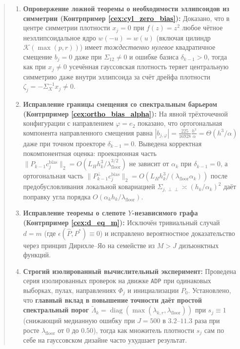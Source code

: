 \documentclass[11pt,a4paper]{article}
\newcommand{\Kern}{\mathcal{K}}
\newcommand{\PEDRs}{P^{*}}
\DeclareMathOperator{\diag}{diag}
\theoremstyle{definition}
\theoremstyle{remark}
\begin{document}
\begin{abstract}
\begin{enumerate}
    \item \textbf{Опровержение ложной теоремы о необходимости эллипсоидов из симметрии (Контрпример \ref{cex:cyl_zero_bias}):} Доказано, что в центре симметрии плотности $x_j = 0$ при $f(z)=z^2$ любое чётное неэллипсоидальное ядро $w(-u)=w(u)$ (включая цилиндр $\Kern(\max(p,r))$) имеет \emph{тождественно нулевое} квадратичное смещение $b_j = 0$ даже при $\Sigma_{12} \neq 0$ и ошибке базиса $\delta_{k-1} > 0$, тогда как при $x_j \neq 0$ усечённая гауссовская плотность теряет центральную симметрию даже внутри эллипсоида за счёт дрейфа плотности $\zeta_j = -\Sigma_X^{-1} x_j \neq 0$.
    \item \textbf{Исправление границы смещения со спектральным барьером (Контрпример \ref{cex:ortho_bias_alpha}):} На явной трёхточечной конфигурации с направлением $\varphi = e_2$ показано, что ортогональная компонента направленного смещения равна $|b_{j,\varphi}| = \frac{225}{16928}\frac{h^3}{\alpha} = \Theta(h^3/\alpha)$ даже при точном проекторе $\delta_{k-1} = 0$. Выведена корректная покомпонентная оценка: проекционная часть $\|P_{k-1} c_j^{\mathrm{bias}}\|_2 = O(L_H h_k^3/\lambda_{\mathrm{floor}}^{3/2})$ не зависит от $\alpha_k$ при $\delta_{k-1}=0$, а ортогональная часть $\|P_{k-1}^\perp c_j^{\mathrm{bias}}\|_2 = O(L_H h_k^3 / (\lambda_{\mathrm{floor}}\alpha_k))$ после предобусловливания локальной ковариацией $\Sigma_{j,\perp\perp} \asymp (h_k/\alpha_k)^2$ даёт поправку угла порядка $O(\alpha_k h_k / \lambda_{\mathrm{floor}})$.
    \item \textbf{Исправление теоремы о слепоте $Y$-независимого графа (Контрпример \ref{cex:d_eq_m}):} Исключён тривиальный случай $d=m$ (где $\epsilon(\hat{P},\PEDRs)\equiv 0$) и исправлено вероятностное доказательство через принцип Дирихле--Яо на семействе из $M > J$ дизъюнктных функций.
    \item \textbf{Строгий изолированный вычислительный эксперимент:} Проведена серия изолированных проверок на движке \texttt{ADP} при одинаковых выборках, пулах, направлениях $\Phi_j$ и инициализации $P_0$. Установлено, что \textbf{главный вклад в повышение точности даёт простой спектральный порог $\widetilde{\Lambda}_k = \diag(\max(\lambda_{k,r}, \lambda_{\mathrm{floor}}))$} при $s_j \equiv 1$ (снижающий медианную ошибку при $J=500$ в $3.2\text{--}11.3$ раза при росте $\lambda_{\mathrm{floor}}$ от $0$ до $0.50$), тогда как множитель плотности $s_j$ сам по себе на гауссовском дизайне часто ухудшает результат.
\end{enumerate}
\end{abstract}
\end{document}
